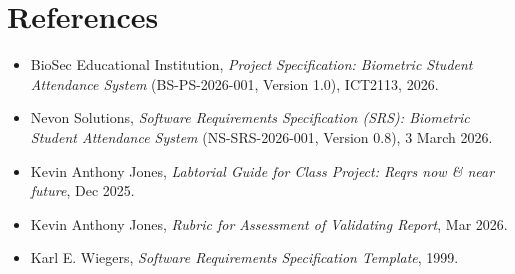 \documentclass[11pt,a4paper]{article}
\begin{document}
\section*{References}
{}
\begin{itemize}[leftmargin=*,nosep]
\item BioSec Educational Institution, \textit{Project Specification: Biometric Student Attendance System} (BS-PS-2026-001, Version 1.0), ICT2113, 2026.
\item Nevon Solutions, \textit{Software Requirements Specification (SRS): Biometric Student Attendance System} (NS-SRS-2026-001, Version 0.8), 3 March 2026.
\item Kevin Anthony Jones, \textit{Labtorial Guide for Class Project: Reqrs now \& near future}, Dec 2025.
\item Kevin Anthony Jones, \textit{Rubric for Assessment of Validating Report}, Mar 2026.
\item Karl E. Wiegers, \textit{Software Requirements Specification Template}, 1999.
\end{itemize}
\end{document}
